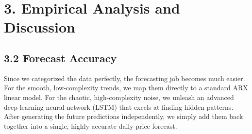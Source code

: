 \documentclass[11pt,a4paper]{article}
\begin{document}
\section{3. Empirical Analysis and Discussion}
\subsection{3.2 Forecast Accuracy}
Since we categorized the data perfectly, the forecasting job becomes much easier. For the smooth, low-complexity trends, we map them directly to a standard ARX linear model. For the chaotic, high-complexity noise, we unleash an advanced deep-learning neural network (LSTM) that excels at finding hidden patterns. After generating the future predictions independently, we simply add them back together into a single, highly accurate daily price forecast.
\end{document}
